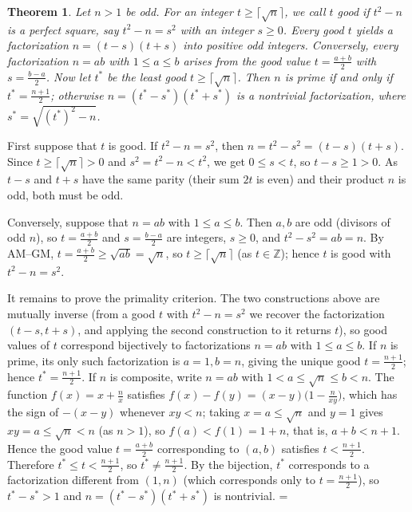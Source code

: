 \documentclass[11pt]{article}
\makeatletter
\theoremstyle{ntstyle}
\newtheorem{theorem}{Theorem}[subsection]
\let\nt@closedisplay\]
\def\nt@guardedclose{\@ifnextchar\par{\nt@closeafterpar}{\@ifnextchar\end{\postdisplaypenalty\@M\nt@closedisplay}{\nt@closedisplay}}}
\def\nt@closeafterpar\par{\@ifnextchar\par{\nt@closeafterpar}{\@ifnextchar\end{\postdisplaypenalty\@M\nt@closedisplay\par}{\nt@closedisplay\par}}}
\renewenvironment{proof}[1][\proofname]{\par
  \pushQED{\qed}\normalfont\topsep\medskipamount\edef\nt@afterproof{\@endparpenalty=\the\@endparpenalty\relax}\@beginparpenalty\@M\@endparpenalty\@M\let\]\nt@guardedclose\trivlist\item[]\textit{#1\@addpunct{.}} \ignorespaces}{\ifvmode\addpenalty\@M\fi\popQED\nt@afterproof\endtrivlist\@endpefalse}
\makeatother
\begin{document}
\begin{theorem}\label{thm:9.5.1} Let $n>1$ be odd. For an integer $t \ge \lceil\sqrt
		{n}\rceil$, we call $t$ good if $t^2-n$ is a perfect square, say
	$t^2 - n = s^2$ with an integer $s \ge 0$. Every good $t$ yields a factorization
	$n = (t-s)(t+s)$ into positive odd integers. Conversely, every
	factorization $n = ab$ with $1 \le a \le b$ arises from the good value $t=\frac{a+b}{2}$ with
	$s=\frac{b-a}{2}$. Now let
	$t^{*}$ be the least good $t \ge \lceil\sqrt{n}\rceil$. Then $n$ is prime
	if and only if $t^{*} = \frac{n+1}{2}$; otherwise $n =
		(t^{*}-s^{*})(t^{*}+s^{*})$ is a nontrivial factorization, where
	$s^{*} = \sqrt{(t^{*})^2-n}$.
\end{theorem}

\begin{proof} First suppose that $t$ is good. If $t^2-n=s^2$, then
	$n=t^2-s^2=(t-s)(t+s)$. Since $t\ge\lceil\sqrt
		{n}\rceil>0$ and $s^2=t^2-n<t^2$, we get
	$0\le s<t$, so $t-s\ge1>0$. As $t-s$ and $t+s$ have the same parity
	(their sum $2t$ is even) and their product $n$ is odd, both must be odd.

	Conversely, suppose that $n=ab$ with $1\le a\le b$. Then
	$a,b$ are odd (divisors of odd $n$), so $t=\frac{a+b}{2}$ and
	$s=\frac{b-a}{2}$ are integers, $s\ge0$, and $t^2-s^2=ab=n$. By AM--GM,
	$t=\frac{a+b}{2}\ge\sqrt{ab}=\sqrt{n}$, so $t\ge\lceil\sqrt{n}\rceil$ (as
	$t\in\mathbb{Z}$); hence $t$ is good with $t^2-n=s^2$.

	It remains to prove the primality criterion. The two constructions above are mutually
	inverse (from a good $t$ with $t^2-n=s^2$ we recover the
	factorization $(t-s,t+s)$, and applying the second construction to it
	returns $t$), so good values of $t$ correspond bijectively to
	factorizations $n=ab$ with $1\le a\le b$. If $n$ is prime, its only
	such factorization is $a=1,b=n$, giving the unique good
	$t=\frac{n+1}{2}$; hence $t^*=\frac{n+1}{2}$. If $n$ is composite,
	write $n=ab$ with $1<a\le\sqrt{n}\le b<n$. The function $f(x)=x+\frac{n}{x}$ satisfies
	$f(x)-f(y)=(x-y)\big(1-\frac{n}{xy}\big)$, which has
	the sign of $-(x-y)$ whenever $xy<n$; taking $x=a\le\sqrt{n}$ and
	$y=1$ gives $xy=a\le\sqrt{n}<n$ (as $n>1$), so $f(a)<f(1)=1+n$, that is, $a+b<n+1$. Hence the good
	value $t=\frac{a+b}{2}$ corresponding to $(a,b)$
	satisfies $t<\frac{n+1}{2}$. Therefore $t^*\le t<\frac{n+1}{2}$, so
	$t^*\neq\frac{n+1}{2}$. By the bijection, $t^*$ corresponds to a
	factorization different from $(1,n)$ (which corresponds only to
	$t=\frac{n+1}{2}$), so $t^*-s^*>1$ and $n=(t^*-s^*)(t^*+s^*)$ is
	nontrivial.
\end{proof}
\end{document}
